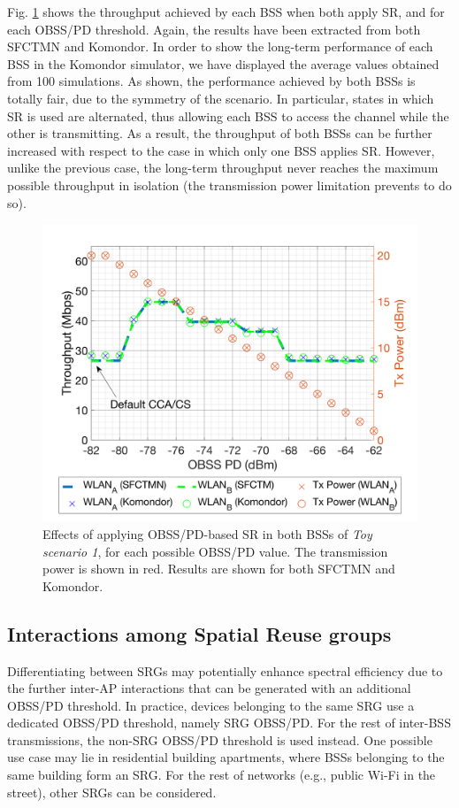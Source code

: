\documentclass{ieeeaccess}
\begin{document}
Fig. \ref{fig:toy_scenario_1c_results} shows the throughput achieved by each BSS when both apply SR, and for each OBSS/PD threshold. Again, the results have been extracted from both SFCTMN and Komondor. In order to show the long-term performance of each BSS in the Komondor simulator, we have displayed the average values obtained from 100 simulations. As shown, the performance achieved by both BSSs is totally fair, due to the symmetry of the scenario. In particular, states in which SR is used are alternated, thus allowing each BSS to access the channel while the other is transmitting. As a result, the throughput of both BSSs can be further increased with respect to the case in which only one BSS applies SR. However, unlike the previous case, the long-term throughput never reaches the maximum possible throughput in isolation (the transmission power limitation prevents to do so).

\begin{figure}[ht!]
	\centering
	\includegraphics[width=\columnwidth]{SIM_1_1b}
	\caption{Effects of applying OBSS/PD-based SR in both BSSs of \emph{Toy scenario 1}, for each possible OBSS/PD value. The transmission power is shown in red. Results are shown for both SFCTMN and Komondor.}		
	\label{fig:toy_scenario_1c_results}
\end{figure}

\subsection{Interactions among Spatial Reuse groups}
\label{section:advanced_interactions}
Differentiating between SRGs may potentially enhance spectral efficiency due to the further inter-AP interactions that can be generated with an additional OBSS/PD threshold. In practice, devices belonging to the same SRG use a dedicated OBSS/PD threshold, namely SRG OBSS/PD. For the rest of inter-BSS transmissions, the non-SRG OBSS/PD threshold is used instead. One possible use case may lie in residential building apartments, where BSSs belonging to the same building form an SRG. For the rest of networks (e.g., public Wi-Fi in the street), other SRGs can be considered.
\end{document}
